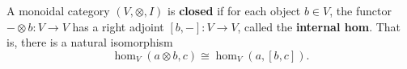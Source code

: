 A monoidal category $(V, \otimes, I)$ is \textbf{closed} if for each object $b \in V$, the functor $-\otimes b: V \rightarrow V$ has a right adjoint $[b, -]: V \rightarrow V$, called the \textbf{internal hom}. That is, there is a natural isomorphism
\[
\hom_V(a \otimes b, c) \cong \hom_V(a, [b, c]).
\]